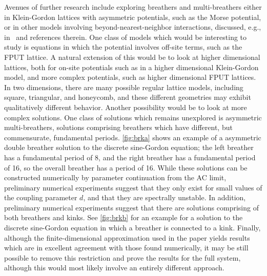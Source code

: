 \documentclass[12pt,reqno]{amsart}
\theoremstyle{definition}
\begin{document}
Avenues of further research include exploring breathers and multi-breathers either in Klein-Gordon lattices with asymmetric potentials, such as the Morse potential, or in other models 
involving beyond-nearest-neighbor interactions, discussed, e.g., in~\cite{PENATI201992} and references therein. One class of models which would be interesting to study is equations in which the potential involves off-site terms, such as the FPUT lattice. A natural extension of this would be to look at higher dimensional lattices, both for on-site potentials such as in a higher dimensional Klein-Gordon model, and more complex potentials, such as higher dimensional FPUT lattices. In two dimensions, there are many possible regular lattice models, including square, triangular, and honeycomb, and these different geometries may exhibit qualitatively different behavior. Another possibility would be to look at more complex solutions. One class of solutions which remains unexplored is asymmetric multi-breathers, solutions comprising breathers which have different, but commensurate, fundamental periods. \cref{fig:brka} shows an example of a asymmetric double breather solution to the discrete sine-Gordon equation; the left breather has a fundamental period of 8, and the right breather has a fundamental period of 16, so the overall breather has a period of 16. While these solutions can be constructed numerically by parameter continuation from the AC limit, preliminary numerical experiments suggest that they only exist for small values of the coupling parameter $d$, and that they are spectrally unstable.
In addition, preliminary numerical experiments suggest that there are solutions comprising of both breathers and kinks. See \cref{fig:brkb} for an example for a solution to the discrete sine-Gordon equation in which a breather is connected to a kink. Finally, although the finite-dimensional approximation used in the paper yields results which are in excellent agreement with those found numerically, it may be still possible to remove this restriction and prove the results for the full system, although this would most likely involve an entirely different approach.
\end{document}
